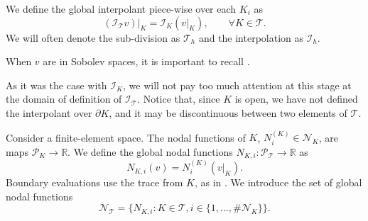 \begin{definition}
    We define the global interpolant piece-wise over each $K_i$ as
    \begin{equation*}
        (\mathcal I_{\mathcal T} v)\Big|_{K} = \mathcal I_K (v|_K), \qquad \forall K \in \mathcal T.
    \end{equation*}
    We will often denote the sub-division as $\mathcal T_h$ and the interpolation as $\mathcal I_h$.
\end{definition}
\begin{remark}
    When $v$ are in Sobolev spaces, it is important to recall .
\end{remark}

As it was the case with $\mathcal I_K$, we will not pay too much attention at this stage at the domain of definition of $\mathcal I_{\mathcal T}$.
Notice that, since $K$ is open, we have not defined the interpolant over $\partial K$, and it may be discontinuous between two elements of $\mathcal T$.

\begin{definition}
    Consider a finite-element space. The nodal functions of $K$, $N_i^{(K)} \in \mathcal N_K$, are maps $\mathcal P_K \to \mathbb R$.
    We define the global nodal functions $N_{K,i} : \mathcal P_{\mathcal T} \to \mathbb R$ as
    \begin{equation*}
        N_{K,i}(v) = N^{(K)}_i(v|_K).
    \end{equation*}
    Boundary evaluations use the trace from $K$, as in .
    We introduce the set of global nodal functions
    \begin{equation*}
        \mathcal N_{\mathcal T} = \{ N_{K,i} : K \in \mathcal T, i \in \{1, \dots, \# \mathcal N_{K}\} \}.
    \end{equation*}
\end{definition}


